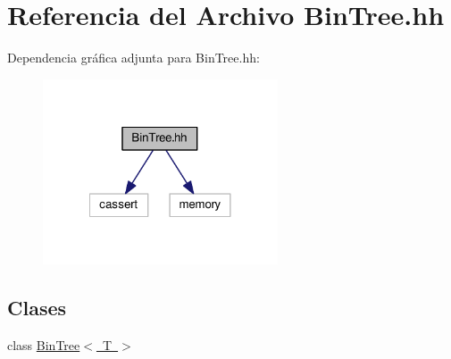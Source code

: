 \hypertarget{_bin_tree_8hh}{}\section{Referencia del Archivo Bin\+Tree.\+hh}
\label{_bin_tree_8hh}
Dependencia gráfica adjunta para Bin\+Tree.\+hh\+:
\nopagebreak
\begin{figure}[H]
\begin{center}
\leavevmode
\includegraphics[width=197pt]{_bin_tree_8hh__incl}
\end{center}
\end{figure}
\subsection*{Clases}
\begin{DoxyCompactItemize}
\item 
class \mbox{\hyperlink{class_bin_tree}{Bin\+Tree$<$ T $>$}}
\end{DoxyCompactItemize}
